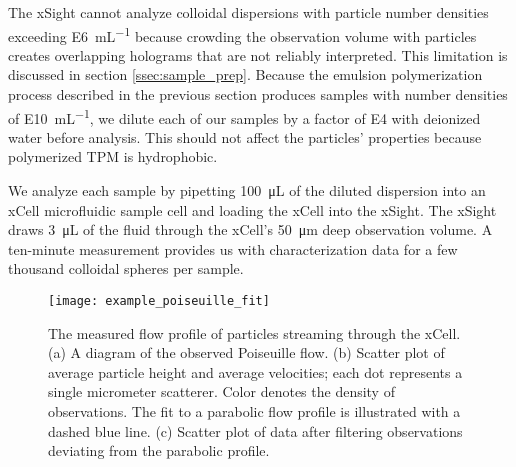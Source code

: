 The xSight cannot analyze colloidal dispersions with particle number densities exceeding
\SI{E6}{\milli\liter^{-1}} because crowding the observation volume with
particles creates overlapping holograms that are not reliably interpreted.
This limitation is discussed in section \ref{ssec:sample_prep}.
Because the emulsion polymerization process described in the previous section
produces samples with number densities of \SI{E10}{\milli\liter^{-1}},
we dilute each of our samples by a factor of \SI{E4}{} with
deionized water before analysis. This should not affect the particles'
properties because polymerized TPM is hydrophobic.

We analyze each sample by pipetting \SI{100}{\micro\liter} of the diluted
dispersion into an xCell microfluidic sample cell and loading the xCell into the xSight.
The xSight draws \SI{3}{\micro\liter} of the fluid through
the xCell's \SI{50}{\um} deep observation volume. A ten-minute measurement provides us with
characterization data for a few thousand colloidal spheres per sample.

\begin{figure}
    \centering
    \texttt{[image: example\_poiseuille\_fit]}
    \caption{The measured flow profile of particles streaming through the xCell.
      (a)  A diagram of the observed Poiseuille flow.\protect\footnotemark 
      (b) Scatter plot of average particle height and average velocities; each
      dot represents a single micrometer scatterer. Color denotes the density of
      observations. The fit to a parabolic flow profile is illustrated with a dashed
      blue line. (c) Scatter plot of data after filtering observations deviating
      from the parabolic profile.}
    \label{fig:flow_prof}
\end{figure}


